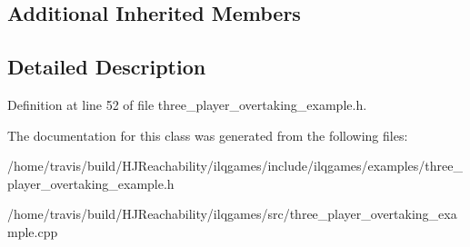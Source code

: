 \subsection*{Additional Inherited Members}


\subsection{Detailed Description}


Definition at line 52 of file three\+\_\+player\+\_\+overtaking\+\_\+example.\+h.



The documentation for this class was generated from the following files\+:\begin{DoxyCompactItemize}
\item 
/home/travis/build/\+H\+J\+Reachability/ilqgames/include/ilqgames/examples/three\+\_\+player\+\_\+overtaking\+\_\+example.\+h\item 
/home/travis/build/\+H\+J\+Reachability/ilqgames/src/three\+\_\+player\+\_\+overtaking\+\_\+example.\+cpp\end{DoxyCompactItemize}

